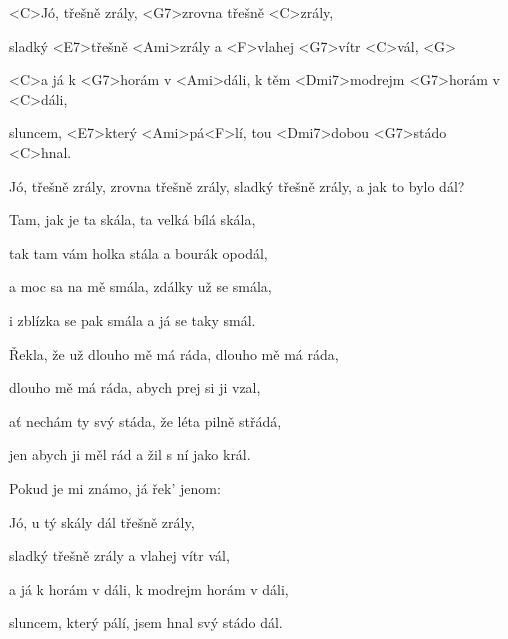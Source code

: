 

\zs
<C>Jó, třešně zrály, <G7>zrovna třešně <C>zrály,

sladký <E7>třešně <Ami>zrály a <F>vlahej <G7>vítr <C>vál, <G>

<C>a já k <G7>horám v <Ami>dáli, k těm <Dmi7>modrejm <G7>horám v <C>dáli,

sluncem, <E7>který <Ami>pá<F>lí, tou <Dmi7>dobou <G7>stádo <C>hnal.
\ks

\zr
Jó, třešně zrály, zrovna třešně zrály, sladký třešně zrály, a jak to bylo dál?
\kr

\zs
Tam, jak je ta skála, ta velká bílá skála,

tak tam vám holka stála a bourák opodál,

a moc sa na mě smála, zdálky už se smála,

i zblízka se pak smála a já se taky smál.
\ks

\zr\kr

\zs
Řekla, že už dlouho mě má ráda, dlouho mě má ráda,

dlouho mě má ráda, abych prej si ji vzal,

ať nechám ty svý stáda, že léta pilně střádá,

jen abych ji měl rád a žil s ní jako král.
\ks

\zr\kr

\zs
Pokud je mi známo, já řek' jenom: 
\ks

\zr\kr

\zs
Jó, u tý skály dál třešně zrály,

sladký třešně zrály a vlahej vítr vál,

a já k horám v dáli, k modrejm horám v dáli,

sluncem, který pálí, jsem hnal svý stádo dál.
\ks

\kp
